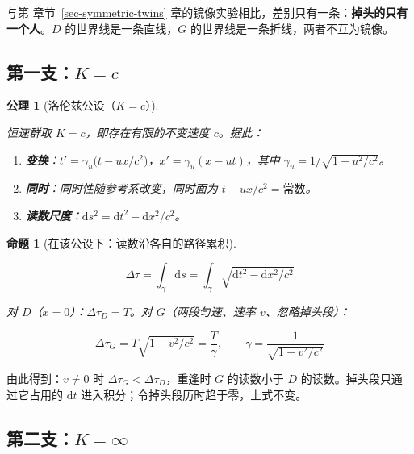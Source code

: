 \documentclass[
  chinese,
  a4paper,
  UTF8,
  12pt,
  oneside,
  openany]{ctexbook}
\providecommand{\tightlist}{%
  \setlength{\itemsep}{0pt}\setlength{\parskip}{0pt}}
\theoremstyle{plain}
\theoremstyle{plain}
\newtheorem{conjecture}{公理}[chapter]
\theoremstyle{plain}
\newtheorem{proposition}{命题}[chapter]
\theoremstyle{definition}
\theoremstyle{plain}
\theoremstyle{plain}
\theoremstyle{remark}
\begin{document}
与第 章节~\ref{sec-symmetric-twins}
章的镜像实验相比，差别只有一条：\textbf{掉头的只有一个人}。\(D\)
的世界线是一条直线，\(G\) 的世界线是一条折线，两者不互为镜像。

\subsection{\texorpdfstring{第一支：\(K=c\)}{第一支：K=c}}\label{sec-ta-branch-c}

\begin{conjecture}[洛伦兹公设（\(K=c\)）]\protect\hypertarget{cnj-ta-lorentz}{}\label{cnj-ta-lorentz}

恒速群取 \(K=c\)，即存在有限的不变速度 \(c\)。据此：

\begin{enumerate}
\def\labelenumi{\arabic{enumi}.}
\tightlist
\item
  \textbf{变换}：\(t'=\gamma_u\bigl(t-ux/c^{2}\bigr)\)，\(x'=\gamma_u(x-ut)\)，其中
  \(\gamma_u=1/\sqrt{1-u^{2}/c^{2}}\)。
\item
  \textbf{同时}：同时性随参考系改变，同时面为
  \(t-ux/c^{2}=\text{常数}\)。
\item
  \textbf{读数尺度}：\(\mathrm{d}s^{2}=\mathrm{d}t^{2}-\mathrm{d}x^{2}/c^{2}\)。
\end{enumerate}

\end{conjecture}

\begin{proposition}[在该公设下：读数沿各自的路径累积]\protect\hypertarget{prp-ta-lorentz-result}{}\label{prp-ta-lorentz-result}

\[
\Delta\tau=\int_{\gamma}\mathrm{d}s=\int_{\gamma}\sqrt{\mathrm{d}t^{2}-\mathrm{d}x^{2}/c^{2}}
\]

对 \(D\)（\(x=0\)）：\(\Delta\tau_D=T\)。对 \(G\)（两段匀速、速率
\(v\)、忽略掉头段）：

\[
\Delta\tau_G=T\sqrt{1-v^{2}/c^{2}}=\frac{T}{\gamma},\qquad \gamma=\frac{1}{\sqrt{1-v^{2}/c^{2}}}
\]

\end{proposition}

由此得到：\(v\neq0\) 时 \(\Delta\tau_G<\Delta\tau_D\)，重逢时 \(G\)
的读数小于 \(D\) 的读数。掉头段只通过它占用的 \(\mathrm{d}t\)
进入积分；令掉头段历时趋于零，上式不变。

\subsection{\texorpdfstring{第二支：\(K=\infty\)}{第二支：K=\textbackslash infty}}\label{sec-ta-branch-infty}
\end{document}
